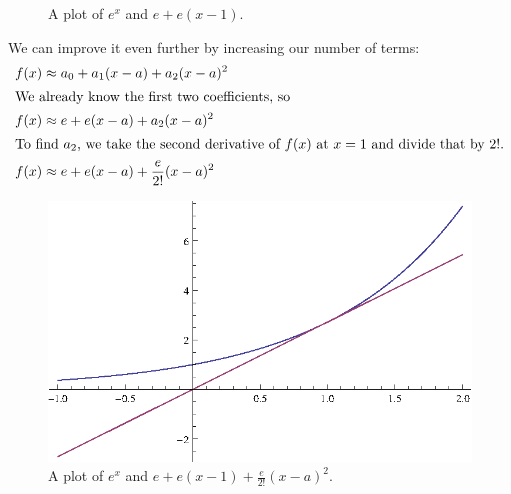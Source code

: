 \begin{ex}
\begin{figure}[H]
\begin{center}
    \end{center}
    \caption{A plot of $e^x$ and $e+e(x-1)$.}
  \end{figure}
  We can improve it even further by increasing our number of terms:
  \begin{align*}
    f(x) &\approx a_0 + a_1 (x-a) + a_2 (x-a)^2 \\
    \intertext{We already know the first two coefficients, so}
    f(x) &\approx e + e (x-a) + a_2 (x-a)^2 \\
    \intertext{To find $a_2$, we take the second derivative of $f(x)$ at $x=1$ and divide that by $2!$.}
    f(x) &\approx e + e (x-a) + \frac{e}{2!} (x-a)^2 \\
  \end{align*}
  \begin{figure}[H]
    \begin{center}
      \includegraphics{continuous/series/1storder}
    \end{center}
    \caption{A plot of $e^x$ and $e+e(x-1)+\frac{e}{2!} (x-a)^2$.}
  \end{figure}
\end{ex}
